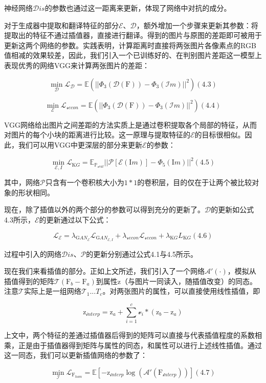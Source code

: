 \documentclass[UTF8,a4paper，12pt]{article}
\def\MC {\mathcal}
\theoremstyle{theorem}
\theoremstyle{definition}
\begin{document}
神经网络$\MC Dis$的参数也通过这一距离来更新，体现了网络中对抗的成分。

对于生成器中提取和翻译特征的部分$\MC E$、$\MC D$，额外增加一个步骤来更新其参数：将提取出的特征不通过插值器，直接进行翻译。得到的图片与原图的差距即可被用于更新这两个网络的参数。实践表明，计算距离时直接将两张图片各像素点的RGB值相减的效果较差，因此，我们引入一个已训练好的、在判别图片差距这一模型上表现优秀的网络VGG来计算两张图片的差距：

$$\min_{\MC D} \MC L_{\MC D} = \mathbb E(||\Phi_3(\MC D(\mathrm F)) - \Phi_3(\MC Im)||^2)    (4.3)$$

$$\min_{\MC E} \MC L_{\MC recon} = \mathbb E(||\Phi_3(\MC D(\mathrm F)) - \Phi_3(\MC Im)||^2)    (4.4)$$

VGG网络给出图片之间差距的方法实质上是通过卷积提取各个局部的特征，从而对图片的每个小块的距离进行比较。这一原理与提取特征的$\MC E$的目标很相似。因此，我们可以用VGG中更深层的部分来更新$\MC E$的参数：

$$\min_{\MC E,I} \MC L_{\mathrm KG} = \mathbb E_{\mathbb P_{\MC real}}||\MC P[\MC E(\mathrm Im)] - \Phi_5(\mathrm Im)||^2    (4.5)$$

其中，网络$\MC P$只含有一个卷积核大小为$1*1$的卷积层，目的仅在于让两个被比较对象的形状相同。

现在，除了插值以外的两个部分的参数可以得到充分的更新了。$\MC D$的更新如公式4.3所示，$\MC E$的更新通过以下公式：

$$\MC L_{\MC E} = \lambda_{\mathrm GAN_{\MC E}}\MC L_{\mathrm GAN_{\MC E,I}} + \lambda_{\MC recon}\MC L_{\MC recon} + \lambda_{\mathrm KG}L_{\mathrm KG}    (4.6)$$

过程中引入的网络$\MC Dis$、$\MC P$的更新分别通过公式4.1与4.5所示。

现在我们来看插值的部分。正如上文所述，我们引入了一个网络$\MC A'(\cdot)$，模拟从插值得到的矩阵$\MC T(\mathrm F_b - \mathrm F_a)$到属性$\mathrm z$（与图片一同读入，随插值改变）的同态。注意$\MC T$实际上是一组网络$\MC T_1...T_c$。对两张图片的属性，可以直接使用线性插值，即

$$\mathrm z_{\MC interp} = \mathrm z_a + \sum_{i=1}^{c}{\MC v_i * (\mathrm z_b - \mathrm z_a)}$$

上文中，两个特征的差通过插值器后得到的矩阵可以直接与代表插值程度的系数相乘，正是由于插值器得到矩阵与属性的同态，和属性可以进行上述线性插值。通过这一同态，我们可以更新插值网络的参数了：

$$\min_ {\MC I} \MC L_{\mathrm F_{hom}} = \mathbb E [-\mathrm z_{\MC interp}\log(\MC A'(\mathrm F_{\MC interp}))]    (4.7)$$
\end{document}
